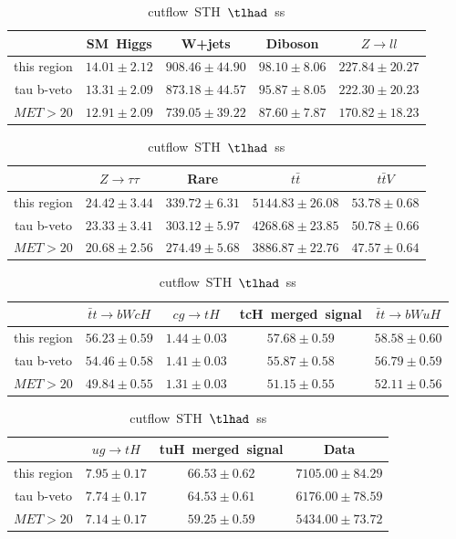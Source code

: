\begin{table}
\footnotesize
\caption{cutflow~STH~$\tlhad$~ss}
\centering
\begin{tabular}{|c|c|c|c|c|} \hline
 & SM~Higgs & W+jets & Diboson & $Z\to ll$\\\hline
this region & $14.01\pm2.12$ & $908.46\pm44.90$ & $98.10\pm8.06$ & $227.84\pm20.27$\\\hline
tau b-veto & $13.31\pm2.09$ & $873.18\pm44.57$ & $95.87\pm8.05$ & $222.30\pm20.23$\\\hline
$MET>20$ & $12.91\pm2.09$ & $739.05\pm39.22$ & $87.60\pm7.87$ & $170.82\pm18.23$\\\hline
\end{tabular}
\begin{tabular}{|c|c|c|c|c|} \hline
 & $Z\to \tau\tau$ & Rare & $t\bar{t}$ & $t\bar{t}V$\\\hline
this region & $24.42\pm3.44$ & $339.72\pm6.31$ & $5144.83\pm26.08$ & $53.78\pm0.68$\\\hline
tau b-veto & $23.33\pm3.41$ & $303.12\pm5.97$ & $4268.68\pm23.85$ & $50.78\pm0.66$\\\hline
$MET>20$ & $20.68\pm2.56$ & $274.49\pm5.68$ & $3886.87\pm22.76$ & $47.57\pm0.64$\\\hline
\end{tabular}
\begin{tabular}{|c|c|c|c|c|} \hline
 & $\bar{t}t\to bWcH$ & $cg\to tH$ & tcH~merged~signal & $\bar{t}t\to bWuH$\\\hline
this region & $56.23\pm0.59$ & $1.44\pm0.03$ & $57.68\pm0.59$ & $58.58\pm0.60$\\\hline
tau b-veto & $54.46\pm0.58$ & $1.41\pm0.03$ & $55.87\pm0.58$ & $56.79\pm0.59$\\\hline
$MET>20$ & $49.84\pm0.55$ & $1.31\pm0.03$ & $51.15\pm0.55$ & $52.11\pm0.56$\\\hline
\end{tabular}
\begin{tabular}{|c|c|c|c|} \hline
 & $ug\to tH$ & tuH~merged~signal & Data\\\hline
this region & $7.95\pm0.17$ & $66.53\pm0.62$ & $7105.00\pm84.29$\\\hline
tau b-veto & $7.74\pm0.17$ & $64.53\pm0.61$ & $6176.00\pm78.59$\\\hline
$MET>20$ & $7.14\pm0.17$ & $59.25\pm0.59$ & $5434.00\pm73.72$\\\hline
\end{tabular}
\label{tab:cutflow_reg1l1tau1b2j_ss}
\end{table}
